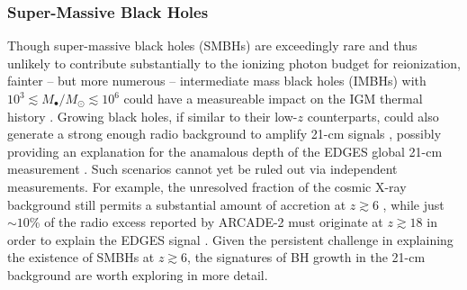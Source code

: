 
\subsubsection{Super-Massive Black Holes}
Though super-massive black holes (SMBHs) are exceedingly rare and thus unlikely to contribute substantially to the ionizing photon budget for reionization, fainter -- but more numerous -- intermediate mass black holes (IMBHs) with $10^3 \lesssim M_{\bullet} / M_{\odot} \lesssim 10^6$ could have a measureable impact on the IGM thermal history \cite{Tanaka2016}. Growing black holes, if similar to their low-$z$ counterparts, could also generate a strong enough radio background to amplify 21-cm signals \cite{EwallWice2018}, possibly providing an explanation for the anamalous depth of the EDGES global 21-cm measurement \cite{Bowman2018}. Such scenarios cannot yet be ruled out via independent measurements. For example, the unresolved fraction of the cosmic X-ray background still permits a substantial amount of accretion at $z \gtrsim 6$ \cite{McQuinn2012,Fialkov2017,Mirocha2018}, while just $\sim 10$\% of the radio excess reported by ARCADE-2 \cite{Fixsen2011,Singal2018} must originate at $z \gtrsim 18$ in order to explain the EDGES signal \cite{Feng2018}. Given the persistent challenge in explaining the existence of SMBHs at $z \gtrsim 6$, the signatures of BH growth in the 21-cm background are worth exploring in more detail.



